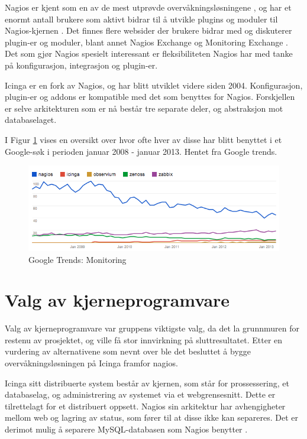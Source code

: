Nagios er kjent som en av de mest utprøvde overvåkningsløsningene \cite{wiki:nagios} \cite{monitoringsetup} \cite{opensourcewatch} \cite{sectools}, og har et enormt antall brukere som aktivt bidrar til å utvikle plugins og moduler til Nagios-kjernen \cite{nagioscommunity}. Det finnes flere websider der brukere bidrar med og diskuterer plugin-er og moduler, blant annet Nagios Exchange \cite{nagiosexchange} og Monitoring Exchange \cite{monitoringexchange}. Det som gjør Nagios spesielt interessant er fleksibiliteten Nagios har med tanke på konfigurasjon, integrasjon og plugin-er.

Icinga er en fork av Nagios, og har blitt utviklet videre siden 2004. Konfigurasjon, plugin-er og addons er kompatible med det som benyttes for Nagios. Forskjellen er selve arkitekturen som er nå består tre separate deler, og abstraksjon mot databaselaget. 

I Figur \ref{losninger} vises en oversikt over hvor ofte hver av disse har blitt benyttet i et Google-søk i perioden januar 2008 - januar 2013. Hentet fra Google trends.

\begin{figure}
    \centering
    \includegraphics[scale=0.6]{img/monitoring_google_trends}
    \caption{Google Trends: Monitoring}
    \label{losninger}
\end{figure}

\section{Valg av kjerneprogramvare}
Valg av kjerneprogramvare var gruppens viktigste valg, da det la grunnmuren for restenu av prosjektet, og ville få stor innvirkning på sluttresultatet. Etter en vurdering av alternativene som nevnt over ble det besluttet å bygge overvåkningsløsningen på Icinga framfor nagios.

Icinga sitt distribuerte system består av kjernen, som står for prossessering, et databaselag, og administrering av systemet via et webgrensesnitt. Dette er tilrettelagt for et distribuert oppsett. Nagios sin arkitektur har avhengigheter mellom web og lagring av status, som fører til at disse ikke kan separeres. Det er derimot mulig å separere MySQL-databasen som Nagios benytter \cite{icingaarchitecture}.

